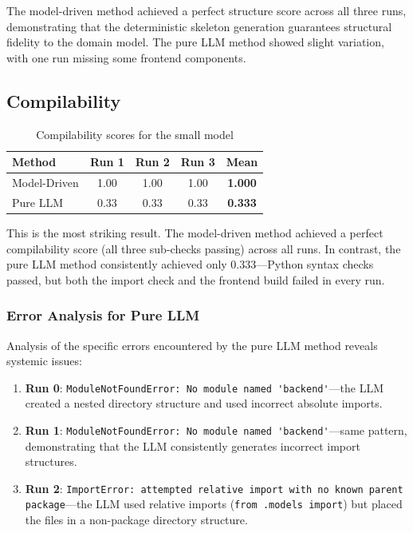 \documentclass[11pt,a4paper]{article}
\begin{document}
The model-driven method achieved a perfect structure score across all three runs, demonstrating that the deterministic skeleton generation guarantees structural fidelity to the domain model. The pure LLM method showed slight variation, with one run missing some frontend components.

\subsection{Compilability}

\begin{table}[H]
\centering
\caption{Compilability scores for the small model}
\label{tab:compilability}
\begin{tabular}{lccc|c}
\toprule
\textbf{Method} & \textbf{Run 1} & \textbf{Run 2} & \textbf{Run 3} & \textbf{Mean} \\
\midrule
Model-Driven & 1.00 & 1.00 & 1.00 & \textbf{1.000} \\
Pure LLM     & 0.33 & 0.33 & 0.33 & \textbf{0.333} \\
\bottomrule
\end{tabular}
\end{table}

This is the most striking result. The model-driven method achieved a perfect compilability score (all three sub-checks passing) across all runs. In contrast, the pure LLM method consistently achieved only 0.333---Python syntax checks passed, but both the import check and the frontend build failed in every run.

\subsubsection{Error Analysis for Pure LLM}

Analysis of the specific errors encountered by the pure LLM method reveals systemic issues:

\begin{enumerate}[leftmargin=*]
    \item \textbf{Run 0}: {\lstinline|ModuleNotFoundError: No module named 'backend'|}---the LLM created a nested directory structure and used incorrect absolute imports.
    \item \textbf{Run 1}: {\lstinline|ModuleNotFoundError: No module named 'backend'|}---same pattern, demonstrating that the LLM consistently generates incorrect import structures.
    \item \textbf{Run 2}: {\lstinline|ImportError: attempted relative import with no known parent package|}---the LLM used relative imports ({\lstinline|from .models import|}) but placed the files in a non-package directory structure.
\end{enumerate}
\end{document}
